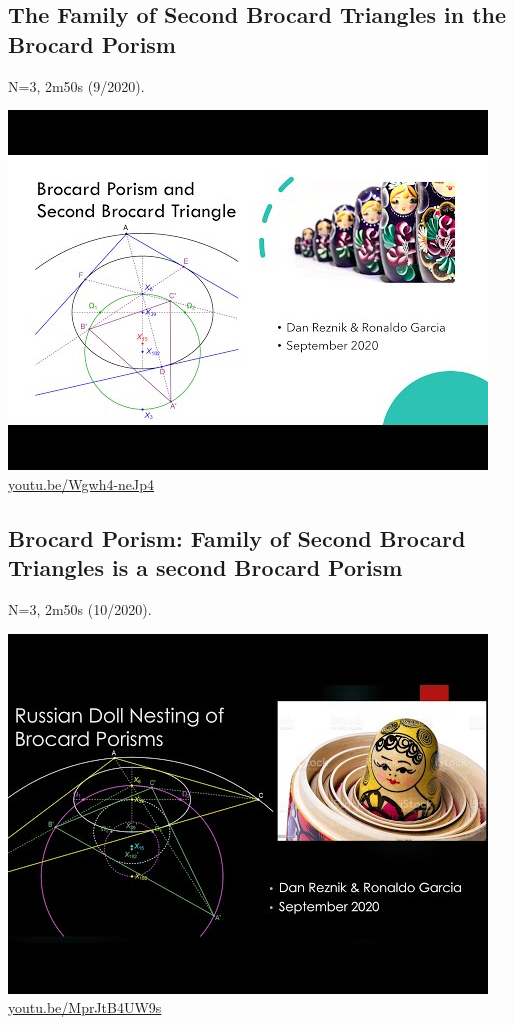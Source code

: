 \documentclass[12pt]{amsart}
\begin{document}
\subsection{The Family of Second Brocard Triangles in the Brocard Porism}
\label{vid:Wgwh4-neJp4}
\noindent N=3, 2m50s (9/2020). 
\begin{center}\includegraphics[width=.5\textwidth]{pics/Wgwh4-neJp4.jpg} \\ 
\href{https://youtu.be/Wgwh4-neJp4}{\url{youtu.be/Wgwh4-neJp4}}\end{center}
% 

\subsection{Brocard Porism: Family of Second Brocard Triangles is a second Brocard Porism}
\label{vid:MprJtB4UW9s}
\noindent N=3, 2m50s (10/2020). 
\begin{center}\includegraphics[width=.5\textwidth]{pics/MprJtB4UW9s.jpg} \\ 
\href{https://youtu.be/MprJtB4UW9s}{\url{youtu.be/MprJtB4UW9s}}\end{center}
% 
\end{document}
